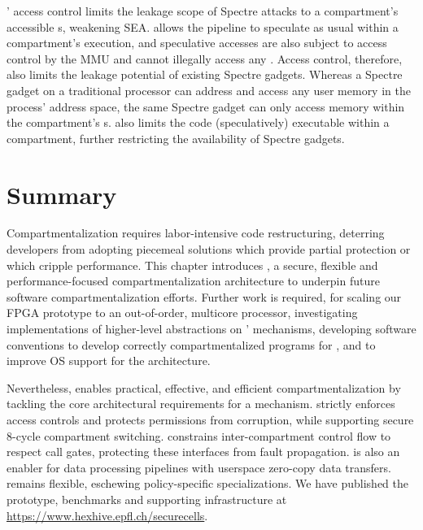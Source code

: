 \seccells' access control limits the leakage scope of 
Spectre attacks to a compartment's accessible \cell{}s, 
weakening SEA.
\seccells allows the pipeline to speculate as usual within a compartment's 
execution, and speculative accesses are also subject to access control 
by the MMU and cannot illegally access any \cell.
Access control, therefore, also limits the leakage potential of existing
Spectre gadgets.
Whereas a Spectre gadget on a traditional processor can address and
access any user memory in the process' address space, the same Spectre
gadget can only access memory within the compartment's \cell{}s.
\seccells also limits the code (speculatively) executable within a compartment,
further restricting the availability of Spectre gadgets.


\section{\seccells Summary}
\label{sec:seccells:conclusion}

Compartmentalization requires labor-intensive code restructuring, 
deterring developers from adopting piecemeal solutions which provide
partial protection or which cripple performance.
This chapter introduces \seccells, a secure, flexible and 
performance-focused compartmentalization architecture to
underpin future software compartmentalization efforts.
Further work is required, for 
scaling our FPGA prototype to an out-of-order, multicore processor, 
investigating implementations of higher-level abstractions 
on \seccells' mechanisms,
developing software conventions to develop correctly
compartmentalized programs for \seccells, 
and to improve OS support for the architecture.

Nevertheless, \seccells enables practical, effective, and efficient
compartmentalization by tackling 
the core architectural requirements for a mechanism.
\seccells strictly enforces access controls and protects permissions
from corruption, while supporting secure 8-cycle compartment switching.
\seccells constrains inter-compartment control flow to respect
call gates, protecting these interfaces from fault propagation.
\seccells is also an enabler for data processing pipelines
with userspace zero-copy data transfers.
\seccells remains flexible, eschewing policy-specific specializations.
We have published the \seccells prototype, benchmarks
and supporting infrastructure
at \url{https://www.hexhive.epfl.ch/securecells}.
